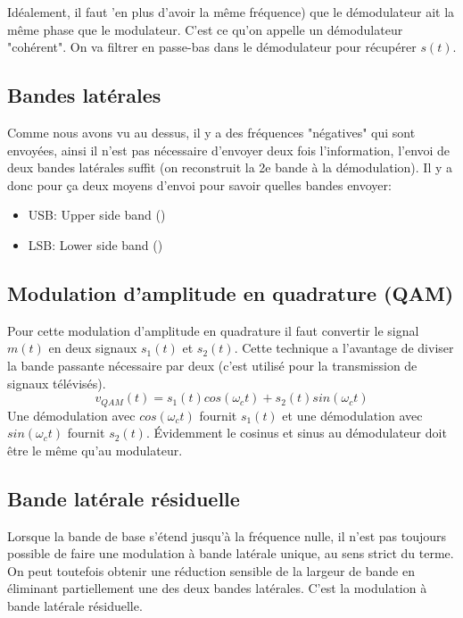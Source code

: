 Idéalement, il faut 'en plus d'avoir la même fréquence) que le démodulateur ait la même phase que le modulateur. C'est ce qu'on appelle un démodulateur "cohérent". On va filtrer en passe-bas dans le démodulateur pour récupérer $s(t)$.

\subsection{Bandes latérales}

Comme nous avons vu au dessus, il y a des fréquences "négatives" qui sont envoyées, ainsi il n'est pas nécessaire d'envoyer deux fois l'information, l'envoi de deux bandes latérales suffit (on reconstruit la 2e bande à la démodulation). Il y a donc pour ça deux moyens d'envoi pour savoir quelles bandes envoyer:
\begin{itemize}
  \item USB: Upper side band ()
  \item LSB: Lower side band ()
\end{itemize}

\subsection{Modulation d'amplitude en quadrature (QAM)}

Pour cette modulation d'amplitude en quadrature il faut convertir le signal $m(t)$ en deux signaux $s_1(t)$ et $s_2(t)$. Cette technique a l'avantage de diviser la bande passante nécessaire par deux (c'est utilisé pour la transmission de signaux télévisés).
\begin{equation*}
v_{QAM}(t) = s_1(t) cos(\omega_c t) + s_2(t) sin(\omega_c t)
\end{equation*}
Une démodulation avec $cos(\omega_c t)$ fournit $s_1(t)$ et une démodulation avec $sin(\omega_c t)$ fournit $s_2(t)$. Évidemment le cosinus et sinus au démodulateur doit être le même qu'au modulateur.

\subsection{Bande latérale résiduelle}

Lorsque la bande de base s'étend jusqu'à la fréquence nulle, il n'est pas toujours possible de faire une modulation à bande latérale unique, au sens strict du terme. On peut toutefois obtenir une réduction sensible de la largeur de bande en éliminant partiellement une des deux bandes latérales. C'est la modulation à bande latérale résiduelle.

